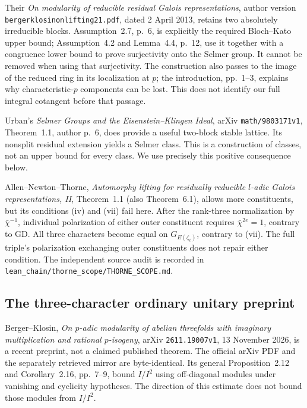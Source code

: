 Their \emph{On modularity of reducible residual Galois
representations}, author version
\texttt{bergerklosinonlifting21.pdf}, dated 2 April 2013,
retains two absolutely irreducible blocks.  Assumption~2.7,
p.~6, is explicitly the required Bloch--Kato upper bound;
Assumption~4.2 and Lemma~4.4, p.~12, use it together with
a congruence lower bound to prove surjectivity onto the
Selmer group.  It cannot be removed when using that
surjectivity.  The construction also passes to the image
of the reduced ring in its localization at $p$; the
introduction, pp.~1--3, explains why characteristic-$p$
components can be lost.  This does not identify our full
integral cotangent before that passage.

Urban's \emph{Selmer Groups and the Eisenstein--Klingen
Ideal}, arXiv \texttt{math/9803171v1}, Theorem~1.1,
author p.~6, does provide a useful two-block stable
lattice.  Its nonsplit residual extension yields a
Selmer class.  This is a construction of classes, not
an upper bound for every class.  We use precisely this
positive consequence below.

Allen--Newton--Thorne, \emph{Automorphy lifting for
residually reducible $l$-adic Galois representations, II},
Theorem~1.1 (also Theorem~6.1), allows more constituents,
but its conditions (iv) and (vii) fail here.  After the
rank-three normalization by $\bar\chi^{-1}$, individual
polarization of either outer constituent requires
$\bar\chi^{2e}=1$, contrary to GD.  All three characters
become equal on $G_{E(\zeta_\ell)}$, contrary to (vii).
The full triple's polarization exchanging outer
constituents does not repair either condition.  The
independent source audit is recorded in
\texttt{lean\_chain/thorne\_scope/THORNE\_SCOPE.md}.

\subsection{The three-character ordinary unitary preprint}

Berger--Klosin, \emph{On $p$-adic modularity of abelian
threefolds with imaginary multiplication and rational
$p$-isogeny}, arXiv \texttt{2611.19007v1}, 13 November
2026, is a recent preprint, not a claimed published
theorem.  The official arXiv PDF and the separately
retrieved mirror are byte-identical.  Its general
Proposition~2.12 and Corollary~2.16, pp.~7--9, bound
$I/I^2$ using off-diagonal modules under vanishing and
cyclicity hypotheses.  The direction of this estimate
does not bound those modules from $I/I^2$.


